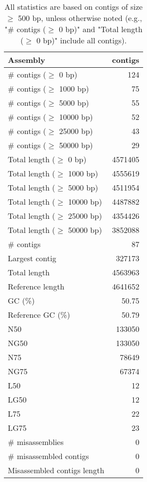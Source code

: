 \documentclass[12pt,a4paper]{article}
\begin{document}
\begin{table}[ht]
\begin{center}
\caption{All statistics are based on contigs of size $\geq$ 500 bp, unless otherwise noted (e.g., "\# contigs ($\geq$ 0 bp)" and "Total length ($\geq$ 0 bp)" include all contigs).}
\begin{tabular}{|l*{1}{|r}|}
\hline
Assembly & contigs \\ \hline
\# contigs ($\geq$ 0 bp) & 124 \\ \hline
\# contigs ($\geq$ 1000 bp) & 75 \\ \hline
\# contigs ($\geq$ 5000 bp) & 55 \\ \hline
\# contigs ($\geq$ 10000 bp) & 52 \\ \hline
\# contigs ($\geq$ 25000 bp) & 43 \\ \hline
\# contigs ($\geq$ 50000 bp) & 29 \\ \hline
Total length ($\geq$ 0 bp) & 4571405 \\ \hline
Total length ($\geq$ 1000 bp) & 4555619 \\ \hline
Total length ($\geq$ 5000 bp) & 4511954 \\ \hline
Total length ($\geq$ 10000 bp) & 4487882 \\ \hline
Total length ($\geq$ 25000 bp) & 4354426 \\ \hline
Total length ($\geq$ 50000 bp) & 3852088 \\ \hline
\# contigs & 87 \\ \hline
Largest contig & 327173 \\ \hline
Total length & 4563963 \\ \hline
Reference length & 4641652 \\ \hline
GC (\%) & 50.75 \\ \hline
Reference GC (\%) & 50.79 \\ \hline
N50 & 133050 \\ \hline
NG50 & 133050 \\ \hline
N75 & 78649 \\ \hline
NG75 & 67374 \\ \hline
L50 & 12 \\ \hline
LG50 & 12 \\ \hline
L75 & 22 \\ \hline
LG75 & 23 \\ \hline
\# misassemblies & 0 \\ \hline
\# misassembled contigs & 0 \\ \hline
Misassembled contigs length & 0 \\ \hline

\end{tabular}
\end{center}
\end{table}
\end{document}

